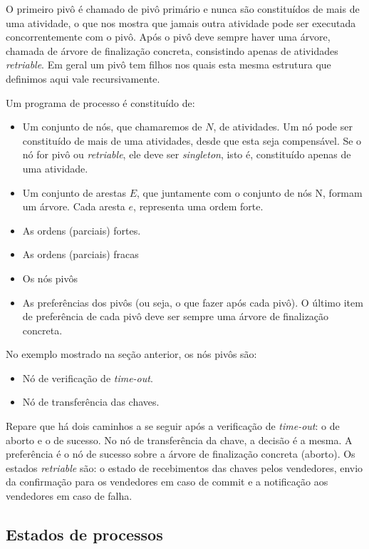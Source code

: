 \documentclass[a4paper,12pt,notitlepage]{article}
\begin{document}
O primeiro pivô é chamado de pivô primário e nunca são constituídos de mais de uma atividade, o que nos mostra que jamais outra atividade pode ser executada concorrentemente com o pivô. Após o pivô deve sempre haver uma árvore, chamada de árvore de finalização concreta, consistindo apenas de atividades \textit{retriable}. Em geral um pivô tem filhos nos quais esta mesma estrutura que definimos aqui vale recursivamente. 

Um programa de processo é constituído de:
\begin{itemize}
  \item Um conjunto de nós, que chamaremos de $N$, de atividades. Um nó pode ser constituído de mais de uma atividades, desde que esta seja compensável. Se o nó for pivô ou \textit{retriable}, ele deve ser \textit{singleton}, isto é, constituído apenas de uma atividade.
  \item Um conjunto de arestas $E$, que juntamente com o conjunto de nós N, formam um árvore. Cada aresta $e$, representa uma ordem forte.
  \item As ordens (parciais) fortes.
  \item As ordens (parciais) fracas
  \item Os nós pivôs
  \item As preferências dos pivôs (ou seja, o que fazer após cada pivô). O último item de preferência de cada pivô deve ser sempre uma árvore de finalização concreta.
\end{itemize}
  
No exemplo mostrado na seção anterior, os nós pivôs são: 
\begin{itemize}  
  \item Nó de verificação de \textit{time-out}. 
  \item Nó de transferência das chaves.
\end{itemize}

Repare que há dois caminhos a se seguir após a verificação de \textit{time-out}: o de aborto e o de sucesso. No nó de transferência da chave, a decisão é a mesma. A preferência é o nó de sucesso sobre a árvore 
de finalização concreta (aborto). Os estados \textit{retriable} são: o estado de recebimentos das chaves pelos vendedores, envio da confirmação para os vendedores em caso de commit e a notificação aos vendedores em caso de falha. 

\subsection{Estados de processos}
\end{document}
